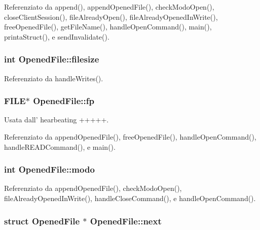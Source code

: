 Referenziato da append(), append\+Opened\+File(), check\+Modo\+Open(), close\+Client\+Session(), file\+Already\+Open(), file\+Already\+Opened\+In\+Write(), free\+Opened\+File(), get\+File\+Name(), handle\+Open\+Command(), main(), printa\+Struct(), e send\+Invalidate().

\hypertarget{structOpenedFile_a3b2e157f5aad06b65bd017d67fde4eb3}{
\subsubsection[{filesize}]{\setlength{\rightskip}{0pt plus 5cm}int Opened\+File\+::filesize}}\label{structOpenedFile_a3b2e157f5aad06b65bd017d67fde4eb3}


Referenziato da handle\+Writes().

\hypertarget{structOpenedFile_a9cdcaccacb2eb66a17c0781666c28b15}{
\subsubsection[{fp}]{\setlength{\rightskip}{0pt plus 5cm}F\+I\+L\+E$\ast$ Opened\+File\+::fp}}\label{structOpenedFile_a9cdcaccacb2eb66a17c0781666c28b15}


Usata dall' hearbeating +++++. 



Referenziato da append\+Opened\+File(), free\+Opened\+File(), handle\+Open\+Command(), handle\+R\+E\+A\+D\+Command(), e main().

\hypertarget{structOpenedFile_a6d9f22ff6ba81506ba9c4a60f27c4f32}{
\subsubsection[{modo}]{\setlength{\rightskip}{0pt plus 5cm}int Opened\+File\+::modo}}\label{structOpenedFile_a6d9f22ff6ba81506ba9c4a60f27c4f32}


Referenziato da append\+Opened\+File(), check\+Modo\+Open(), file\+Already\+Opened\+In\+Write(), handle\+Close\+Command(), e handle\+Open\+Command().

\hypertarget{structOpenedFile_a9b8c8b995cdda6da249a6ce9a9df98b2}{
\subsubsection[{next}]{\setlength{\rightskip}{0pt plus 5cm}struct {\bf Opened\+File} $\ast$ Opened\+File\+::next}}\label{structOpenedFile_a9b8c8b995cdda6da249a6ce9a9df98b2}


